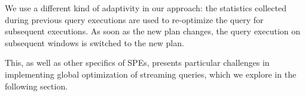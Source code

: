 We use a different kind of adaptivity in our approach: the statistics collected during previous query executions are used to re-optimize the query for subsequent executions. As soon as the new plan changes, the query execution on subsequent windows is switched to the new plan. 

This, as well as other specifics of SPEs, presents particular challenges in implementing global optimization of streaming queries, which we explore in the following section.
